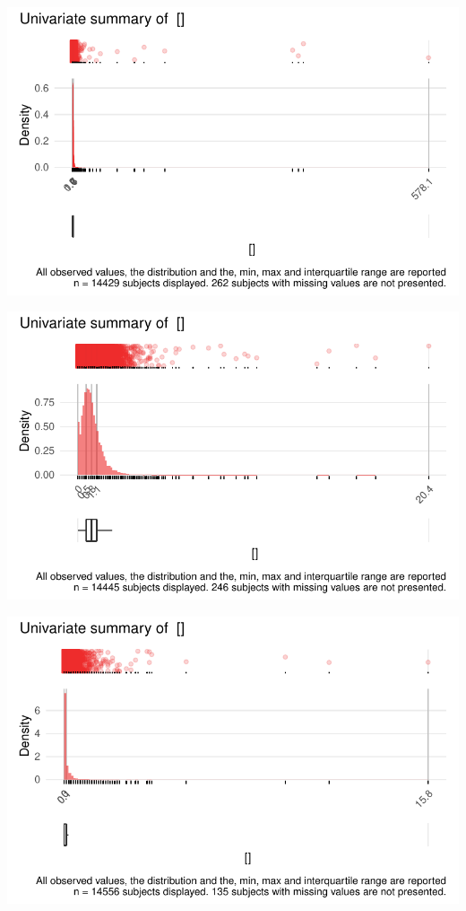 \documentclass[
  letterpaper,
  DIV=11,
  numbers=noendperiod]{scrreport}
\begin{document}
\includegraphics{./Bact_univar_files/figure-pdf/uni04-8.pdf}

\includegraphics{./Bact_univar_files/figure-pdf/uni04-9.pdf}

\includegraphics{./Bact_univar_files/figure-pdf/uni04-10.pdf}
\end{document}
